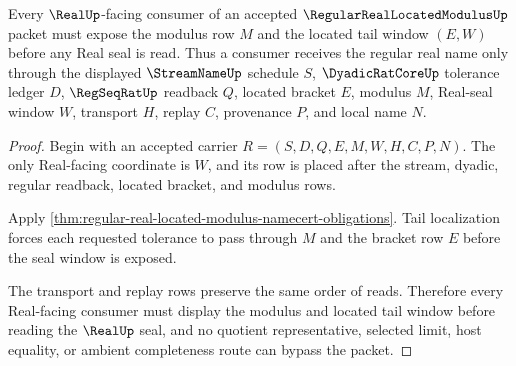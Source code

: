 \begin{theorem}
\label{thm:regular-real-located-modulus-tail-localization}
Every $\RealUp$-facing consumer of an accepted $\RegularRealLocatedModulusUp$ packet must expose the modulus row $M$ and the located tail window $(E,W)$ before any Real seal is read. Thus a consumer receives the regular real name only through the displayed $\StreamNameUp$ schedule $S$, $\DyadicRatCoreUp$ tolerance ledger $D$, $\RegSeqRatUp$ readback $Q$, located bracket $E$, modulus $M$, Real-seal window $W$, transport $H$, replay $C$, provenance $P$, and local name $N$.
\end{theorem}
\begin{proof}
Begin with an accepted carrier $R=(S,D,Q,E,M,W,H,C,P,N)$. The only Real-facing coordinate is $W$, and its row is placed after the stream, dyadic, regular readback, located bracket, and modulus rows.

Apply \autoref{thm:regular-real-located-modulus-namecert-obligations}. Tail localization forces each requested tolerance to pass through $M$ and the bracket row $E$ before the seal window is exposed.

The transport and replay rows preserve the same order of reads. Therefore every Real-facing consumer must display the modulus and located tail window before reading the $\RealUp$ seal, and no quotient representative, selected limit, host equality, or ambient completeness route can bypass the packet.
\end{proof}


\begin{closurestatus}{\RegularRealLocatedModulusUp}
  \theoryclosure{\seedClosure}
  \formalstatus{\unformalizedV}
\end{closurestatus}
